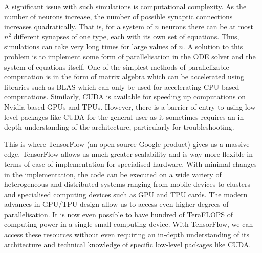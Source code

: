 \documentclass[10pt,letterpaper]{article}
\begin{document}
A significant issue with such simulations is computational complexity. As the number of neurons increase, the number of possible synaptic connections increases quadratically. That is, for a system of $n$ neurons there can be at most $n^2$ different synapses of one type, each with its own set of equations. Thus, simulations can take very long times for large values of $n$. A solution to this problem is to implement some form of parallelisation in the ODE solver and the system of equations itself. One of the simplest methods of parallelizable computation is in the form of matrix algebra which can be accelerated using libraries such as BLAS which can only be used for accelerating CPU based computations. Similarly, CUDA is available for speeding up computations on Nvidia-based GPUs and TPUs. However, there is a barrier of entry to using low-level packages like CUDA for the general user as it sometimes requires an in-depth understanding of the architecture, particularly for troubleshooting.

This is where TensorFlow (an open-source Google product) gives us a massive edge. TensorFlow allows us much greater scalability and is way more flexible in terms of ease of implementation for specialised hardware. With minimal changes in the implementation, the code can be executed on a wide variety of heterogeneous and distributed systems ranging from mobile devices to clusters and specialised computing devices such as GPU and TPU cards. The modern advances in GPU/TPU design allow us to access even higher degrees of parallelisation. It is now even possible to have hundred of TeraFLOPS of computing power in a single small computing device. With TensorFlow, we can access these resources without even requiring an in-depth understanding of its architecture and technical knowledge of specific low-level packages like CUDA.


\end{document}
